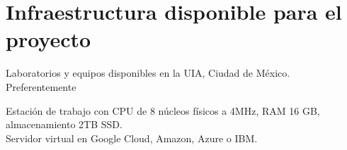 \section {Infraestructura disponible para el proyecto}
Laboratorios y equipos disponibles en la UIA, Ciudad de México.\\
Preferentemente

Estación de trabajo con CPU de 8 núcleos físicos a 4MHz, RAM 16 GB, almacenamiento 2TB SSD.\\
Servidor virtual en Google Cloud, Amazon, Azure o IBM.